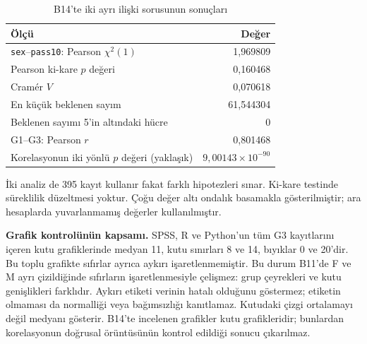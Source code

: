 \begin{table}[H]
\centering
\caption{B14'te iki ayrı ilişki sorusunun sonuçları}
\label{tab:b14-dogrulanmis-iliski}
\begin{tabular}{@{}lr@{}}
\toprule
Ölçü & Değer \\
\midrule
\texttt{sex}--\texttt{pass10}: Pearson $\chi^2(1)$ & 1,969809 \\
Pearson ki-kare $p$ değeri & 0,160468 \\
Cramér $V$ & 0,070618 \\
En küçük beklenen sayım & 61,544304 \\
Beklenen sayımı 5'in altındaki hücre & 0 \\
\midrule
G1--G3: Pearson $r$ & 0,801468 \\
Korelasyonun iki yönlü $p$ değeri (yaklaşık) & $9{,}00143\times10^{-90}$ \\
\bottomrule
\end{tabular}
\par\smallskip
{\footnotesize İki analiz de 395 kayıt kullanır fakat farklı
hipotezleri sınar. Ki-kare testinde süreklilik düzeltmesi yoktur.
Çoğu değer altı ondalık basamakla gösterilmiştir; ara hesaplarda
yuvarlanmamış değerler kullanılmıştır.\par}
\end{table}

\textbf{Grafik kontrolünün kapsamı.} SPSS, R ve Python'un tüm G3
kayıtlarını içeren kutu grafiklerinde medyan 11, kutu sınırları
8 ve 14, bıyıklar 0 ve 20'dir. Bu toplu grafikte sıfırlar ayrıca
aykırı işaretlenmemiştir. Bu durum B11'de F ve M ayrı çizildiğinde
sıfırların işaretlenmesiyle çelişmez: grup çeyrekleri ve kutu
genişlikleri farklıdır. Aykırı etiketi verinin hatalı olduğunu
göstermez; etiketin olmaması da normalliği veya bağımsızlığı kanıtlamaz.
Kutudaki çizgi ortalamayı değil medyanı gösterir. B14'te incelenen
grafikler kutu grafikleridir; bunlardan korelasyonun doğrusal
örüntüsünün kontrol edildiği sonucu çıkarılmaz.

